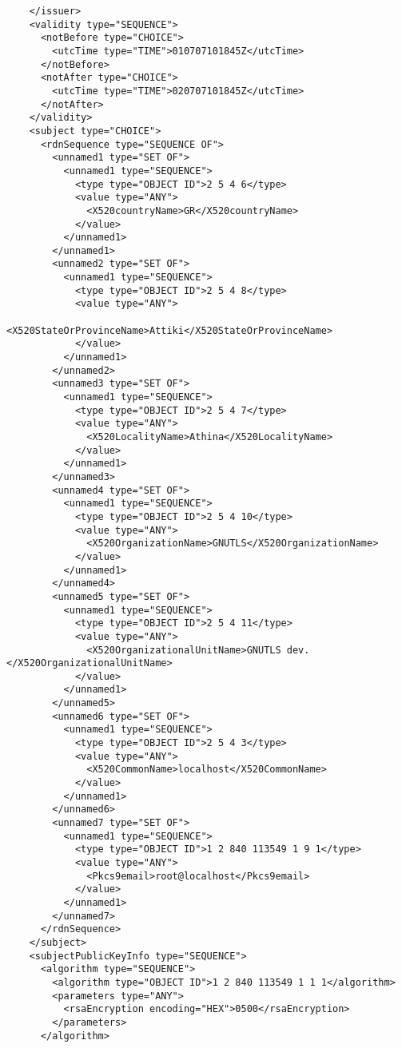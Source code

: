 \begin{verbatim}
    </issuer>
    <validity type="SEQUENCE">
      <notBefore type="CHOICE">
        <utcTime type="TIME">010707101845Z</utcTime>
      </notBefore>
      <notAfter type="CHOICE">
        <utcTime type="TIME">020707101845Z</utcTime>
      </notAfter>
    </validity>
    <subject type="CHOICE">
      <rdnSequence type="SEQUENCE OF">
        <unnamed1 type="SET OF">
          <unnamed1 type="SEQUENCE">
            <type type="OBJECT ID">2 5 4 6</type>
            <value type="ANY">
              <X520countryName>GR</X520countryName>
            </value>
          </unnamed1>
        </unnamed1>
        <unnamed2 type="SET OF">
          <unnamed1 type="SEQUENCE">
            <type type="OBJECT ID">2 5 4 8</type>
            <value type="ANY">
              <X520StateOrProvinceName>Attiki</X520StateOrProvinceName>
            </value>
          </unnamed1>
        </unnamed2>
        <unnamed3 type="SET OF">
          <unnamed1 type="SEQUENCE">
            <type type="OBJECT ID">2 5 4 7</type>
            <value type="ANY">
              <X520LocalityName>Athina</X520LocalityName>
            </value>
          </unnamed1>
        </unnamed3>
        <unnamed4 type="SET OF">
          <unnamed1 type="SEQUENCE">
            <type type="OBJECT ID">2 5 4 10</type>
            <value type="ANY">
              <X520OrganizationName>GNUTLS</X520OrganizationName>
            </value>
          </unnamed1>
        </unnamed4>
        <unnamed5 type="SET OF">
          <unnamed1 type="SEQUENCE">
            <type type="OBJECT ID">2 5 4 11</type>
            <value type="ANY">
              <X520OrganizationalUnitName>GNUTLS dev.</X520OrganizationalUnitName>
            </value>
          </unnamed1>
        </unnamed5>
        <unnamed6 type="SET OF">
          <unnamed1 type="SEQUENCE">
            <type type="OBJECT ID">2 5 4 3</type>
            <value type="ANY">
              <X520CommonName>localhost</X520CommonName>
            </value>
          </unnamed1>
        </unnamed6>
        <unnamed7 type="SET OF">
          <unnamed1 type="SEQUENCE">
            <type type="OBJECT ID">1 2 840 113549 1 9 1</type>
            <value type="ANY">
              <Pkcs9email>root@localhost</Pkcs9email>
            </value>
          </unnamed1>
        </unnamed7>
      </rdnSequence>
    </subject>
    <subjectPublicKeyInfo type="SEQUENCE">
      <algorithm type="SEQUENCE">
        <algorithm type="OBJECT ID">1 2 840 113549 1 1 1</algorithm>
        <parameters type="ANY">
          <rsaEncryption encoding="HEX">0500</rsaEncryption>
        </parameters>
      </algorithm>

\end{verbatim}
